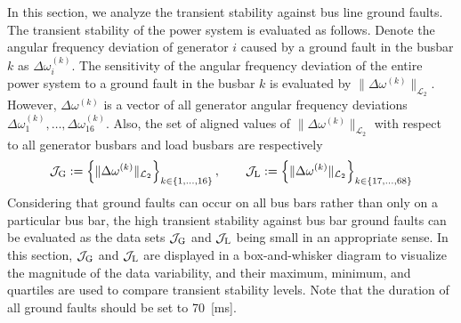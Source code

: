 \documentclass[tombow,dvipdfmx]{corona-a5-1.1}
\begin{document}
In this section, we analyze the transient stability against bus line ground faults.
The transient stability of the power system is evaluated as follows.
Denote the angular frequency deviation of generator $i$ caused by a ground fault in the busbar $k$ as $\Delta \omega_i^{(k)}$.
The sensitivity of the angular frequency deviation of the entire power system to a ground fault in the busbar $k$ is evaluated by $\|\Delta \omega^{(k)}\|_{\mathcal{L}_2}$.
However, $\Delta \omega^{(k)}$ is a vector of all generator angular frequency deviations $\Delta \omega_1^{(k)},\ldots,\Delta \omega_{16}^{(k)}$.
Also, the set of aligned values of $\|\Delta \omega^{(k)}\|_{\mathcal{L}_2}$ with respect to all generator busbars and load busbars are respectively
\begin{align*}%
\mathcal{J}_{\rm G}:=
\left\{
\| \Delta \omega^{(k)} \|_{\mathcal{L}_2}
\right\}_{k\in \{1,\ldots,16\} }
,\qquad
\mathcal{J}_{\rm L}
:=
\left\{
\| \Delta \omega^{(k)} \|_{\mathcal{L}_2}
\right\}_{k\in \{17,\ldots,68\} }
\end{align*}
Considering that ground faults can occur on all bus bars rather than only on a particular bus bar, the high transient stability against bus bar ground faults can be evaluated as the data sets $\mathcal{J}_{\rm G}$ and $\mathcal{J}_{\rm L}$ being small in an appropriate sense.
In this section, $\mathcal{J}_{\rm G}$ and $\mathcal{J}_{\rm L}$ are displayed in a box-and-whisker diagram to visualize the magnitude of the data variability, and their maximum, minimum, and quartiles are used to compare transient stability levels.
Note that the duration of all ground faults should be set to 70~[ms].
\end{document}
